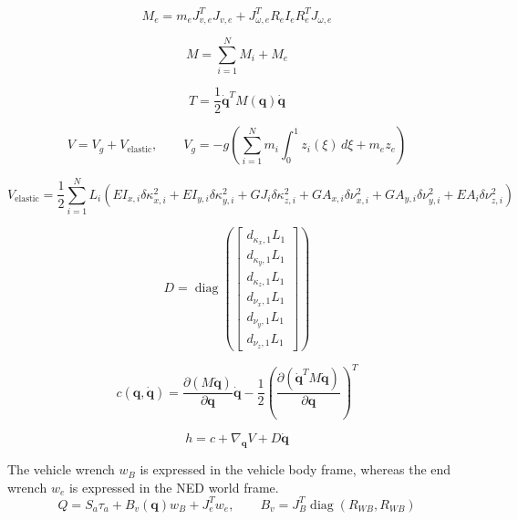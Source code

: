 \documentclass[11pt]{article}
\begin{document}
\begin{equation}
M_e=m_eJ_{v,e}^{T}J_{v,e}+J_{\omega,e}^{T}R_eI_eR_e^TJ_{\omega,e}
\end{equation}

\begin{equation}
M=\sum_{i=1}^{N}M_i+M_e\label{eq:mass-assembly}
\end{equation}

\begin{equation}
T=\frac12\dot{\boldsymbol q}^{T}M(\boldsymbol q)\dot{\boldsymbol q}
\end{equation}

\begin{equation}
V=V_g+V_{\mathrm{elastic}},\qquad V_g=-g\!\left(\sum_{i=1}^{N}m_i\int_0^1z_i(\xi)\,d\xi+m_ez_e\right)
\end{equation}

\begin{equation}
V_{\mathrm{elastic}}=\frac12\sum_{i=1}^{N}L_i\left(EI_{x,i}\delta\kappa_{x,i}^2+EI_{y,i}\delta\kappa_{y,i}^2+GJ_i\delta\kappa_{z,i}^2+GA_{x,i}\delta\nu_{x,i}^2+GA_{y,i}\delta\nu_{y,i}^2+EA_i\delta\nu_{z,i}^2\right)
\end{equation}

\begin{equation}
D=\operatorname{diag}\!\left(\begin{bmatrix}d_{\kappa_x,1} L_{1}\\d_{\kappa_y,1} L_{1}\\d_{\kappa_z,1} L_{1}\\d_{\nu_x,1} L_{1}\\d_{\nu_y,1} L_{1}\\d_{\nu_z,1} L_{1}\end{bmatrix}\right)
\end{equation}

\begin{equation}
c(\boldsymbol q,\dot{\boldsymbol q})=\frac{\partial(M\dot{\boldsymbol q})}{\partial\boldsymbol q}\dot{\boldsymbol q}-\frac12\left(\frac{\partial(\dot{\boldsymbol q}^{T}M\dot{\boldsymbol q})}{\partial\boldsymbol q}\right)^T
\end{equation}

\begin{equation}
h=c+\nabla_{\boldsymbol q}V+D\dot{\boldsymbol q}
\end{equation}

The vehicle wrench $w_B$ is expressed in the vehicle body frame, whereas the end wrench $w_e$ is expressed in the NED world frame.
\begin{equation}
Q=S_a\tau_a+B_v(\boldsymbol q)w_B+J_e^Tw_e,\qquad B_v=J_B^T\operatorname{diag}(R_{WB},R_{WB})
\end{equation}
\end{document}
